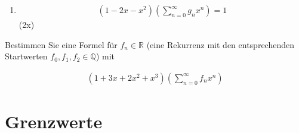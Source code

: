 \documentclass{article}
\begin{document}
\begin{enumerate}
    \item \begin{align*}
        (1 - 2x - x^2)\left(\sum_{n=0}^{\infty}g_nx^n\right) = 1
    \end{align*} (2x)
\end{enumerate}

Bestimmen Sie eine Formel für $f_n \in \mathbb{R}$ (eine Rekurrenz mit den entsprechenden Startwerten $f_0, f_1, f_2 \in \mathbb{Q}$) mit

\begin{align*}
    (1 + 3x + 2x^2 + x^3)\left(\sum_{n = 0}^{\infty}f_nx^n\right)
\end{align*}

\section*{Grenzwerte}
\end{document}
